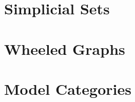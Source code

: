 \documentclass[../../../deep-dive]{subfiles}
\begin{document}
\chapter{Simplicial Sets}



\chapter{Wheeled Graphs}



\chapter{Model Categories}


\end{document}

